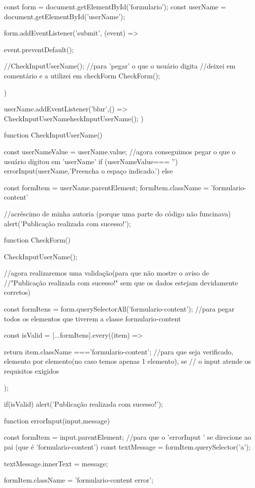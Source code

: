 const form = document.getElementById('formulario');
const userName = document.getElementById('userName');

form.addEventListener('submit', (event) =>{
  event.preventDefault();

  //CheckInputUserName();
  //para 'pegar' o que o usuário digita
  //deixei em comentário e a utilizei em checkForm  
  CheckForm();

})



userName.addEventListener('blur',() =>{
    CheckInputUserNameheckInputUserName();
})

function CheckInputUserName(){
const userNameValue = userName.value;
//agora conseguimos pegar o que o usuário digitou em 'userName'
if (userNameValue=== '') {
    errorInput(userName,'Preencha o espaço indicado.')
}else{
    const formItem = userName.parentElement;
    formItem.className = 'formulario-content'

    //acréscimo de minha autoria (porque uma parte do código não funcinava)
    alert('Publicação realizada com sucesso!');
}


function CheckForm(){
    CheckInputUserName();

    //agora realizaremos uma validação(para que não mostre o aviso de 
    //"Publicação realizada com sucesso!" sem que os dados estejam devidamente corretos)

    const formItens = form.querySelectorAll('formulario-content');
    //para pegar todos os elementos que tiverem a classe  formulario-content

    const isValid = [...formItens].every((item) =>{
        return item.className ==='formulario-content';
         //para que seja verificado, elemento por elemento(no caso temos apenas 1 elemento), se 
         // o input atende os requisitos exigidos

    });

    if(isValid){
        alert('Publicação realizada com sucesso!');
            }


}

function errorInput(input,message) {
    const formItem = input.parentElement;
    //para que o 'errorInput ' se direcione ao pai (que é 'formulario-content')
    const textMessage = formItem.querySelector('a');


    textMessage.innerText = message;

    formItem.className = 'formulario-content error';
}
}
